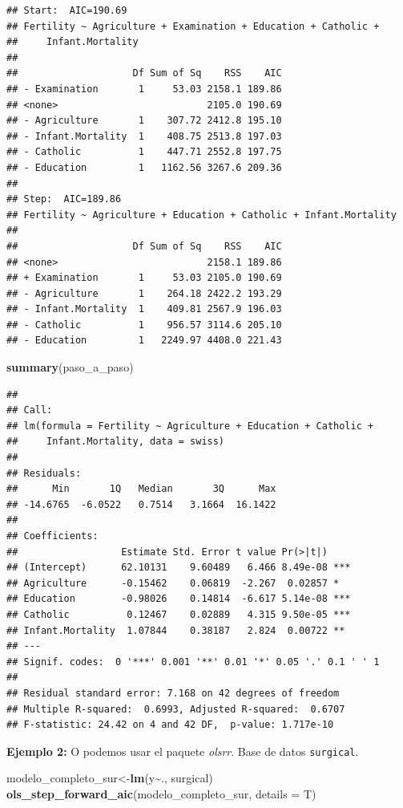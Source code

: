 \documentclass[
]{book}
\newenvironment{Shaded}{\begin{snugshade}}{\end{snugshade}}
\newcommand{\AttributeTok}[1]{\textcolor[rgb]{0.13,0.29,0.53}{#1}}
\newcommand{\FunctionTok}[1]{\textcolor[rgb]{0.13,0.29,0.53}{\textbf{#1}}}
\newcommand{\NormalTok}[1]{#1}
\newcommand{\OtherTok}[1]{\textcolor[rgb]{0.56,0.35,0.01}{#1}}
\newcommand{\SpecialCharTok}[1]{\textcolor[rgb]{0.81,0.36,0.00}{\textbf{#1}}}
\begin{document}
\begin{verbatim}
## Start:  AIC=190.69
## Fertility ~ Agriculture + Examination + Education + Catholic + 
##     Infant.Mortality
## 
##                    Df Sum of Sq    RSS    AIC
## - Examination       1     53.03 2158.1 189.86
## <none>                          2105.0 190.69
## - Agriculture       1    307.72 2412.8 195.10
## - Infant.Mortality  1    408.75 2513.8 197.03
## - Catholic          1    447.71 2552.8 197.75
## - Education         1   1162.56 3267.6 209.36
## 
## Step:  AIC=189.86
## Fertility ~ Agriculture + Education + Catholic + Infant.Mortality
## 
##                    Df Sum of Sq    RSS    AIC
## <none>                          2158.1 189.86
## + Examination       1     53.03 2105.0 190.69
## - Agriculture       1    264.18 2422.2 193.29
## - Infant.Mortality  1    409.81 2567.9 196.03
## - Catholic          1    956.57 3114.6 205.10
## - Education         1   2249.97 4408.0 221.43
\end{verbatim}

\begin{Shaded}
\begin{Highlighting}[]
\FunctionTok{summary}\NormalTok{(paso\_a\_paso)}
\end{Highlighting}
\end{Shaded}

\begin{verbatim}
## 
## Call:
## lm(formula = Fertility ~ Agriculture + Education + Catholic + 
##     Infant.Mortality, data = swiss)
## 
## Residuals:
##      Min       1Q   Median       3Q      Max 
## -14.6765  -6.0522   0.7514   3.1664  16.1422 
## 
## Coefficients:
##                  Estimate Std. Error t value Pr(>|t|)    
## (Intercept)      62.10131    9.60489   6.466 8.49e-08 ***
## Agriculture      -0.15462    0.06819  -2.267  0.02857 *  
## Education        -0.98026    0.14814  -6.617 5.14e-08 ***
## Catholic          0.12467    0.02889   4.315 9.50e-05 ***
## Infant.Mortality  1.07844    0.38187   2.824  0.00722 ** 
## ---
## Signif. codes:  0 '***' 0.001 '**' 0.01 '*' 0.05 '.' 0.1 ' ' 1
## 
## Residual standard error: 7.168 on 42 degrees of freedom
## Multiple R-squared:  0.6993, Adjusted R-squared:  0.6707 
## F-statistic: 24.42 on 4 and 42 DF,  p-value: 1.717e-10
\end{verbatim}

\textbf{Ejemplo 2:} O podemos usar el paquete \emph{olsrr}. Base de datos \texttt{surgical}.

\begin{Shaded}
\begin{Highlighting}[]
\NormalTok{modelo\_completo\_sur}\OtherTok{\textless{}{-}}\FunctionTok{lm}\NormalTok{(y}\SpecialCharTok{\textasciitilde{}}\NormalTok{., surgical)}
\FunctionTok{ols\_step\_forward\_aic}\NormalTok{(modelo\_completo\_sur, }\AttributeTok{details =}\NormalTok{ T)}
\end{Highlighting}
\end{Shaded}
\end{document}
